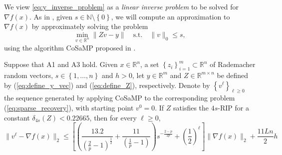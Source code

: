 We view \eqref{eq:y_inverse_problem} as a {\em linear inverse problem} to be solved for $\nabla f(x)$. As in \cite{cai2022zeroth}, given $s\in\mathbb{N}\setminus\left\{0\right\}$, we will compute an approximation to $\nabla f(x)$ by approximately solving the problem
\begin{equation}
 \min_{v\in\mathbb{R}^{n}}  \|Zv-y\| \quad \text{s.t.} \quad                              \|v\|_{0}\leq s,
\label{eq:sparse_recovery}
\end{equation}
using the algorithm CoSaMP proposed in \cite{needell2009cosamp}. 

\begin{lemma}
\label{lem:2.2}
Suppose that A1 and A3 hold. Given $x\in\mathbb{R}^{n}$, a set $\left\{z_{i}\right\}_{i=1}^{m}\subset\mathbb{R}^{n}$ of Rademacher random vectors, $s\in\left\{1,\ldots,n\right\}$ and $h>0$, let $y\in\mathbb{R}^{m}$ and $Z\in\mathbb{R}^{m\times n}$ be defined by (\ref{eq:define_y_vec}) and (\ref{eq:define_Z}), respectively. Denote by $\left\{v^{\ell}\right\}_{\ell\geq 0}$ the sequence generated by applying CoSaMP to the corresponding problem (\ref{eq:sparse_recovery}), with starting point $v^{0}=0$. If $Z$ satisfies the $4s$-RIP for a constant $\delta_{4s}(Z)<0.22665$, then for every $\ell\geq 0$,
\begin{equation}
\|v^{\ell}-\nabla f(x)\|_{2}\leq \left[\left(\frac{13.2}{\left(\frac{2}{p}-1\right)^{\frac{1}{2}}}+\frac{11}{\left(\frac{1}{p}-1\right)}\right)s^{-\frac{2-p}{2p}}+\left(\frac{1}{2}\right)^{\ell}\right]\|\nabla f(x)\|_{2}+\dfrac{11 Ln}{2}h
\label{eq:2.5}
\end{equation} 

\end{lemma}


